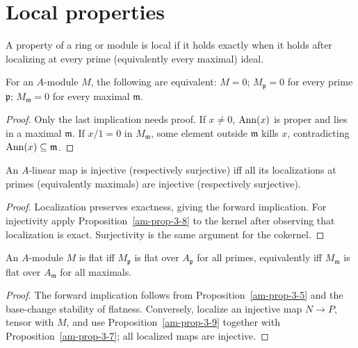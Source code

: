 \section{Local properties}
\label{am-ch3-local-properties}
\begin{definition}
\label{am-def-local-property}
\uses{}
A property of a ring or module is local if it holds exactly when it holds after
localizing at every prime (equivalently every maximal) ideal.
\end{definition}
\begin{proposition}
\label{am-prop-3-8}
\uses{}
For an $A$-module $M$, the following are equivalent: $M=0$;
$M_\mathfrak{p}=0$ for every prime $\mathfrak{p}$; $M_\mathfrak{m}=0$ for every maximal $\mathfrak{m}$.
\end{proposition}
\begin{proof}
Only the last implication needs proof.  If $x\ne0$, $\operatorname{Ann}(x)$ is proper and
lies in a maximal $\mathfrak{m}$.  If $x/1=0$ in $M_\mathfrak{m}$, some element outside $\mathfrak{m}$ kills
$x$, contradicting $\operatorname{Ann}(x)\subseteq\mathfrak{m}$.
\end{proof}
\begin{proposition}
\label{am-prop-3-9}
\uses{}
An $A$-linear map is injective (respectively surjective) iff all its
localizations at primes (equivalently maximals) are injective (respectively
surjective).
\end{proposition}
\begin{proof}
Localization preserves exactness, giving the forward implication.  For
injectivity apply Proposition~\ref{am-prop-3-8} to the kernel after observing
that localization is exact.  Surjectivity is the same argument for the cokernel.
\end{proof}
\begin{proposition}
\label{am-prop-3-10}
\uses{}
An $A$-module $M$ is flat iff $M_\mathfrak{p}$ is flat over $A_\mathfrak{p}$ for all primes,
equivalently iff $M_\mathfrak{m}$ is flat over $A_\mathfrak{m}$ for all maximals.
\end{proposition}
\begin{proof}
The forward implication follows from Proposition~\ref{am-prop-3-5} and the
base-change stability of flatness.  Conversely, localize an injective map
$N\to P$, tensor with $M$, and use Proposition~\ref{am-prop-3-9} together
with Proposition~\ref{am-prop-3-7}; all localized maps are injective.
\end{proof}

